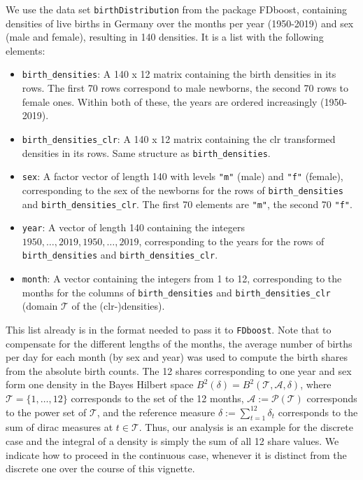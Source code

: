 \documentclass{article}
\newcommand{\Rpackage}[1]{{\normalfont\fontseries{b}\selectfont #1}}
\newcommand{\Roperator}[1]{\texttt{#1}}
\begin{document}
We use the data set \texttt{birthDistribution} from the package \Rpackage{FDboost}, containing densities of live births in Germany over the months per year (1950-2019) and sex (male and female), resulting in 140 densities.
It is a list with the following elements:
\begin{itemize}
\item
\texttt{birth\_densities}:
A 140 x 12 matrix containing the birth densities in its rows. The first 70 rows correspond to male newborns, the second 70 rows to female ones. Within both of these, the years are ordered increasingly (1950-2019).
\item
\texttt{birth\_densities\_clr}:
A 140 x 12 matrix containing the clr transformed densities in its rows. Same structure as \texttt{birth\_densities}.
\item
\texttt{sex}:
A factor vector of length 140 with levels \texttt{"m"} (male) and \texttt{"f"} (female), corresponding to the sex of the newborns for the rows of \texttt{birth\_densities} and \texttt{birth\_densities\_clr}. The first 70 elements are \texttt{"m"}, the second 70 \texttt{"f"}.
\item
\texttt{year}:
A vector of length 140 containing the integers $1950, \ldots, 2019, 1950, \ldots, 2019$, corresponding to the years for the rows of \texttt{birth\_densities} and \texttt{birth\_densities\_clr}.
\item
\texttt{month}:
A vector containing the integers from 1 to 12, corresponding to the months for the columns of \texttt{birth\_densities} and \texttt{birth\_densities\_clr} (domain $\mathcal{T}$ of the (clr-)densities).
\end{itemize}
This list already is in the format needed to pass it to \Roperator{FDboost}.
Note that to compensate for the different lengths of the months, the average number of births per day for each month (by sex and year) was used to compute the birth shares from the absolute birth counts.
The 12 shares corresponding to one year and sex form one density in the Bayes Hilbert space $B^2(\delta) = B^2\left( \mathcal{T}, \mathcal{A}, \delta\right)$, where $\mathcal{T} = \{1, \ldots, 12\}$ corresponds to the set of the 12 months, $\mathcal{A} := \mathcal{P}(\mathcal{T})$ corresponds to the power set of $\mathcal{T}$, and the reference measure $\delta := \sum_{t = 1}^{12} \delta_t$ corresponds to the sum of dirac measures at $t \in \mathcal{T}$.
Thus, our analysis is an example for the discrete case and the integral of a density is simply the sum of all 12 share values.
We indicate how to proceed in the continuous case, whenever it is distinct from the discrete one over the course of this vignette.
\end{document}
